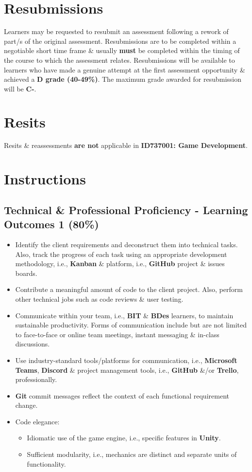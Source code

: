 \documentclass{article}
\begin{document}
\section*{Resubmissions}
Learners may be requested to resubmit an assessment following a rework of part/s of the original assessment. Resubmissions are to be completed within a negotiable short time frame \& usually \textbf{must} be completed within the timing of the course to which the assessment relates. Resubmissions will be available to learners who have made a genuine attempt at the first assessment opportunity \& achieved a \textbf{D grade (40-49\%)}. The maximum grade awarded for resubmission will be \textbf{C-}.

\section*{Resits}
Resits \& reassessments \textbf{are not} applicable in \textbf{ID737001: Game Development}.

\section*{Instructions}

\subsection*{Technical \& Professional Proficiency - Learning Outcomes 1 (80\%)}
\begin{itemize}
	\item Identify the client requirements and deconstruct them into technical tasks. Also, track the progress of each task using an appropriate development methodology, i.e., \textbf{Kanban} \& platform, i.e., \textbf{GitHub} project \& issues boards. 
	\item Contribute a meaningful amount of code to the client project. Also, perform other technical jobs such as code reviews \& user testing. 
	\item Communicate within your team, i.e., \textbf{BIT} \& \textbf{BDes} learners, to maintain sustainable productivity. Forms of communication include but are not limited to face-to-face or online team meetings, instant messaging \& in-class discussions. 
	\item Use industry-standard tools/platforms for communication, i.e., \textbf{Microsoft Teams}, \textbf{Discord} \& project management tools, i.e., \textbf{GitHub} \&/or \textbf{Trello}, professionally. 
	\item \textbf{Git} commit messages reflect the context of each functional requirement change.
	\item Code elegance:
	\begin{itemize}
		\item Idiomatic use of the game engine, i.e., specific features in \textbf{Unity}.
		\item Sufficient modularity, i.e., mechanics are distinct and separate units of functionality.
	\end{itemize}
\end{itemize}
\end{document}
